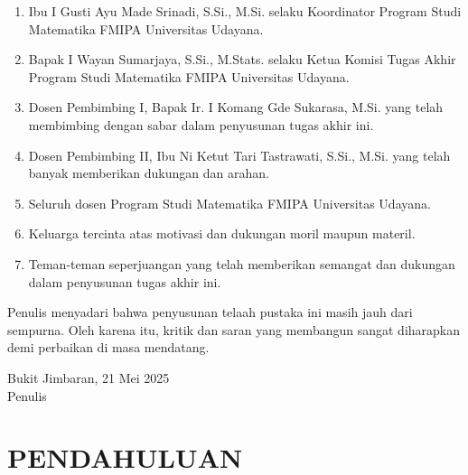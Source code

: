 \documentclass[a4paper,12pt]{report}
\numberwithin{equation}{chapter}
\begin{document}
\begin{enumerate}
    \item Ibu I Gusti Ayu Made Srinadi, S.Si., M.Si. selaku Koordinator Program Studi Matematika FMIPA Universitas Udayana.
    \item Bapak I Wayan Sumarjaya, S.Si., M.Stats. selaku Ketua Komisi Tugas Akhir Program Studi Matematika FMIPA Universitas Udayana.
    \item Dosen Pembimbing I, Bapak Ir. I Komang Gde Sukarasa, M.Si. yang telah membimbing dengan sabar dalam penyusunan tugas akhir ini.
    \item Dosen Pembimbing II, Ibu Ni Ketut Tari Tastrawati, S.Si., M.Si. yang telah banyak memberikan dukungan dan arahan.
    \item Seluruh dosen Program Studi Matematika FMIPA Universitas Udayana.
    \item Keluarga tercinta atas motivasi dan dukungan moril maupun materil.
    \item Teman-teman seperjuangan yang telah memberikan semangat dan dukungan dalam penyusunan tugas akhir ini.
\end{enumerate}

Penulis menyadari bahwa penyusunan telaah pustaka ini masih jauh dari sempurna. Oleh karena itu, kritik dan saran yang membangun sangat diharapkan demi perbaikan di masa mendatang.

\begin{flushright}
Bukit Jimbaran, 21 Mei 2025 \\
\vspace{2cm}
Penulis
\end{flushright}

\newpage
\renewcommand{\contentsname}{DAFTAR ISI}
\tableofcontents
{}

\newpage
\renewcommand{\listtablename}{DAFTAR TABEL}
\listoftables

\newpage
\renewcommand{\listfigurename}{DAFTAR GAMBAR}
\listoffigures

\newpage
{}
\pagestyle{mainmatter}


\chapter{PENDAHULUAN}
\label{chap:pendahuluan}
\end{document}
